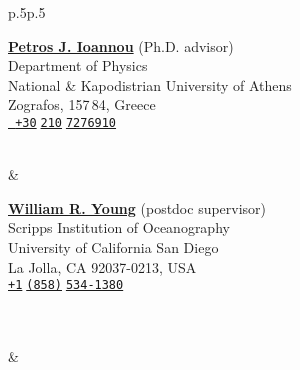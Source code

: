 \documentclass[10pt, letter]{article}
\newcommand{\ekpa}{National \& Kapodistrian University of Athens}
\begin{document}
\begin{tabular}{p{}p{}}
\begin{minipage}[c]{.49\textwidth}
\raggedright \href{https://scholar.google.com/citations?hl=en&user=oNmKI6UAAAAJ}{\color{black}\textbf{Petros J. Ioannou}} (Ph.D. advisor)\\
Department of Physics\\
\ekpa\\
Zografos, 157\,84, Greece\\
{}\hspace{.188cm}\texttt{\href{skype:+302107276910?sms}{ +30$\;$210$\;$7276910}}\\
\hspace{-.1em}\\
\hspace{.1em}{w}
\end{minipage}%
&
\begin{minipage}[c]{.49\textwidth}
\raggedright \href{https://scholar.google.com/citations?hl=en&user=xv3aIBsAAAAJ}{\color{black}\textbf{William R. Young}} (postdoc supervisor)\\
Scripps Institution of Oceanography\\
University of California San Diego\\
La Jolla, CA 92037-0213, USA\\
{}\hspace{.188cm}\texttt{\href{skype:+18585341380?sms}{+1$\;$(858)$\;$534-1380}}\\
\hspace{-.1em}\\
\hspace{.1em}{w}\end{minipage}\\
\mbox{}&\\
\begin{minipage}[c]{.55\textwidth}

\end{minipage}
\end{tabular}
\end{document}
